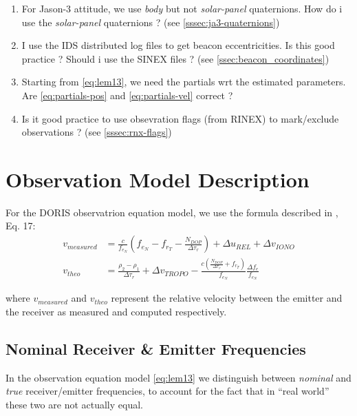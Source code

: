 \begin{enumerate}
  \item For Jason-3 attitude, we use \emph{body} but not \emph{solar-panel} 
    quaternions. How do i use the \emph{solar-panel} quaternions ? (see \ref{sssec:ja3-quaternions})

  \item I use the IDS distributed log files to get beacon eccentricities. Is 
    this good practice ? Should i use the SINEX files ? (see \ref{ssec:beacon_coordinates})

  \item Starting from \ref{eq:lem13}, we need the partials wrt the estimated 
    parameters. Are \ref{eq:partials-pos} and \ref{eq:partials-vel} correct ?

  \item Is it good practice to use obsevration flags (from RINEX) to mark/exclude 
    observations ? (see \ref{sssec:rnx-flags})

\end{enumerate}


\section{Observation Model Description}
\label{sec:doris-introduction}

For the DORIS observatrion equation model, we use the formula described in 
\cite{lemoine-2016}, Eq. 17:
\begin{subequations} \label{eq:lem13}
    \begin{align}
        v_{measured} & = \frac{c}{f_{e_N}} (f_{e_N} - f_{r_T} -
          \frac{N_{DOP}}{\Delta\tau_r}) + \Delta u_{REL} + 
          \Delta v_{IONO} \label{eq:lem13a} \\
        v_{theo} &= \frac{\rho_2 - \rho_1}{\Delta\tau_r} +
          \Delta v_{TROPO} - \frac{c(\frac{N_{DOP}}{\Delta\tau_r} + 
          f_{r_T})}{f_{e_N}} \frac{\Delta f_e}{f_{e_N}} \label{eq:lem13b}
    \end{align}
\end{subequations}

where $v_{measured}$ and $v_{theo}$ represent the relative velocity between  
the emitter and the receiver as measured and computed respectively.

\subsection{Nominal Receiver \& Emitter Frequencies}
\label{ssec:nominal-frequencies}
In the observation equation model \ref{eq:lem13} we distinguish between 
\emph{nominal} and \emph{true} receiver/emitter frequencies, to account for 
the fact that in ``real world'' these two are not actually equal.

